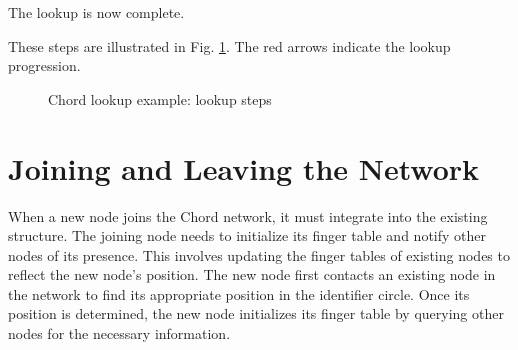 The lookup is now complete.

These steps are illustrated in Fig. \ref{fig:chord-example-lookup-steps}. The red arrows indicate the lookup progression.

\begin{figure}[htbp]
    \centering
    \caption{Chord lookup example: lookup steps}
    \label{fig:chord-example-lookup-steps}
\end{figure}

\section{Joining and Leaving the Network}
When a new node joins the Chord network, it must integrate into the existing structure.
The joining node needs to initialize its finger table and notify other nodes of its presence.
This involves updating the finger tables of existing nodes to reflect the new node's position.
The new node first contacts an existing node in the network to find its appropriate position in the identifier circle.
Once its position is determined, the new node initializes its finger table by querying other nodes for the necessary information.

